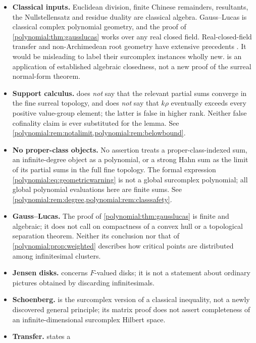 \documentclass[11pt,letterpaper]{article}
\numberwithin{equation}{section}
\theoremstyle{definition}
\theoremstyle{remark}\newtheorem{remark}[theorem]{Remark}
\begin{document}
\begin{itemize}
\item \textbf{Classical inputs.} Euclidean division, finite Chinese
remainders, resultants, the Nullstellensatz and residue duality are classical
algebra. Gauss--Lucas is classical complex polynomial geometry, and the proof
of \cref{polynomial:thm:gausslucas} works over any real closed field.
Real-closed-field transfer and non-Archimedean root geometry have extensive
precedents
\cite{polynomial:TarskiSurvey,polynomial:Eisermann,polynomial:Faber,polynomial:CohenMahboubi}.
It would be misleading to label their surcomplex instances wholly new.
 is an application of established algebraic
closedness, not a new proof of the surreal normal-form theorem.
\item \textbf{Support calculus.}  does
\emph{not} say that the relevant partial sums converge in the fine surreal
topology, and does \emph{not} say that $k\rho$ eventually exceeds every
positive value-group element; the latter is false in higher rank. Neither
false cofinality claim is ever substituted for the lemma. See
\cref{polynomial:rem:notalimit,polynomial:rem:belowbound}.
\item \textbf{No proper-class objects.} No assertion treats a
proper-class-indexed sum, an infinite-degree object as a polynomial, or a
strong Hahn sum as the limit of its partial sums in the full fine topology.
The formal expression \eqref{polynomial:eq:geometricwarning} is not a global
surcomplex polynomial; all global polynomial evaluations here are finite sums.
See \cref{polynomial:rem:degree,polynomial:rem:classsafety}.
\item \textbf{Gauss--Lucas.} The proof of
\cref{polynomial:thm:gausslucas} is finite and algebraic; it does not call on
compactness of a convex hull or a topological separation theorem. Neither its
conclusion nor that of \cref{polynomial:prop:weighted} describes how critical
points are distributed among infinitesimal clusters.
\item \textbf{Jensen disks.}  concerns
$F$-valued disks; it is not a statement about ordinary pictures obtained by
discarding infinitesimals.
\item \textbf{Schoenberg.}  is the
surcomplex version of a classical inequality, not a newly discovered general
principle; its matrix proof does not assert completeness of an
infinite-dimensional surcomplex Hilbert space.
\item \textbf{Transfer.}  states a

\end{itemize}
\end{document}
